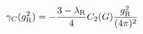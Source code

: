 \begin{equation}
 \gamma_C(g_{\rm R}^2) 
 =- \frac{3-\lambda_{\rm R}}4 C_2(G)
  \frac{g_{\rm R}^2}{(4\pi)^2} 
\label{adimghost}  
\end{equation}

